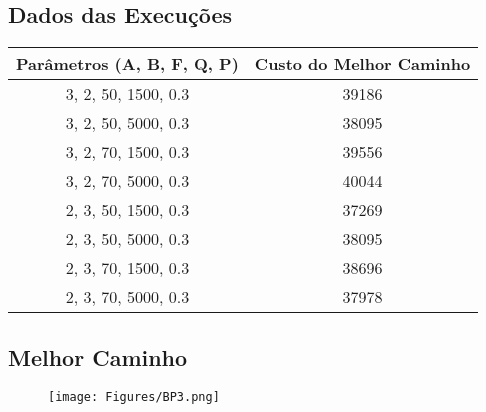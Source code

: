 \documentclass[hidelinks,12pt]{article}
\begin{document}
	\newpage
	\subsection{Dados das Execuções}
	\begin{table}[!h]
		\centering
		
			\begin{tabular}{|c|c|}
			\hline
			\multicolumn{1}{|c|}{Parâmetros (A, B, F, Q, P)} & \multicolumn{1}{|c|}{Custo do Melhor Caminho} \\ \hline
			3, 2, 50, 1500, 0.3                               &              39186                                \\ \hline

			3, 2, 50, 5000, 0.3                              &               38095                               \\ \hline
			
			3, 2, 70, 1500, 0.3                               &              39556                                \\ \hline
			
			3, 2, 70, 5000, 0.3                              &                40044                              \\ \hline
			
			2, 3, 50, 1500, 0.3                               &               37269                               \\ \hline
			
			2, 3, 50, 5000, 0.3                              &              38095                                \\ \hline
			
			2, 3, 70, 1500, 0.3                               &            38696                                  \\ \hline
			
			2, 3, 70, 5000, 0.3                              &             37978                                 \\ \hline
			
			\end{tabular}
	\end{table}
	
	\subsection{Melhor Caminho}
	
			\begin{figure}[!h]
				\centering
				\texttt{[image: Figures/BP3.png]}
			\end{figure}	
	
\end{document}
